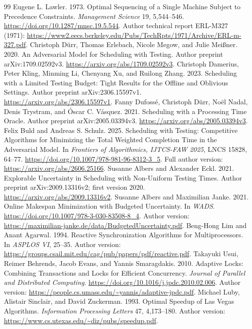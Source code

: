 \documentclass[acmsmall,screen,review,anonymous]{acmart}
\begin{document}
\begin{thebibliography}{99}
 Eugene L. Lawler. 1973. Optimal Sequencing of a Single Machine Subject to Precedence Constraints. \emph{Management Science} 19, 5,544--546. \url{https://doi.org/10.1287/mnsc.19.5.544}. Author technical report ERL-M327 (1971): \url{https://www2.eecs.berkeley.edu/Pubs/TechRpts/1971/Archive/ERL-m-327.pdf}.
 Christoph D\"urr, Thomas Erlebach, Nicole Megow, and Julie Mei\ss ner. 2020. An Adversarial Model for Scheduling with Testing. Author preprint arXiv:1709.02592v3. \url{https://arxiv.org/abs/1709.02592v3}.
 Christoph Damerius, Peter Kling, Minming Li, Chenyang Xu, and Ruilong Zhang. 2023. Scheduling with a Limited Testing Budget: Tight Results for the Offline and Oblivious Settings. Author preprint arXiv:2306.15597v1. \url{https://arxiv.org/abs/2306.15597v1}.
 Fanny Dufoss\'e, Christoph D\"urr, No\"el Nadal, Denis Trystram, and \'Oscar C. V\'asquez. 2021. Scheduling with a Processing Time Oracle. Author preprint arXiv:2005.03394v3. \url{https://arxiv.org/abs/2005.03394v3}.
 Felix Buld and Andreas S. Schulz. 2025. Scheduling with Testing: Competitive Algorithms for Minimizing the Total Weighted Completion Time in the Adversarial Model. In \emph{Frontiers of Algorithmics, IJTCS-FAW 2025}, LNCS 15828, 64--77. \url{https://doi.org/10.1007/978-981-96-8312-3_5}. Full author version: \url{https://arxiv.org/abs/2606.25166}.
 Susanne Albers and Alexander Eckl. 2021. Explorable Uncertainty in Scheduling with Non-Uniform Testing Times. Author preprint arXiv:2009.13316v2; first version 2020. \url{https://arxiv.org/abs/2009.13316v2}.
 Susanne Albers and Maximilian Janke. 2021. Online Makespan Minimization with Budgeted Uncertainty. In \emph{WADS}. \url{https://doi.org/10.1007/978-3-030-83508-8_4}. Author version: \url{https://maximilian-janke.de/data/BudgetedUncertainty.pdf}.
 Beng-Hong Lim and Anant Agarwal. 1994. Reactive Synchronization Algorithms for Multiprocessors. In \emph{ASPLOS VI}, 25--35. Author version: \url{https://groups.csail.mit.edu/cag/pub/papers/pdf/reactive.pdf}.
 Takayuki Usui, Reimer Behrends, Jacob Evans, and Yannis Smaragdakis. 2010. Adaptive Locks: Combining Transactions and Locks for Efficient Concurrency. \emph{Journal of Parallel and Distributed Computing}. \url{https://doi.org/10.1016/j.jpdc.2010.02.006}. Author version: \url{https://people.cs.umass.edu/~yannis/adaptive-jpdc.pdf}.
 Michael Luby, Alistair Sinclair, and David Zuckerman. 1993. Optimal Speedup of Las Vegas Algorithms. \emph{Information Processing Letters} 47, 4,173--180. Author version: \url{https://www.cs.utexas.edu/~diz/pubs/speedup.pdf}.


\end{thebibliography}
\end{document}
